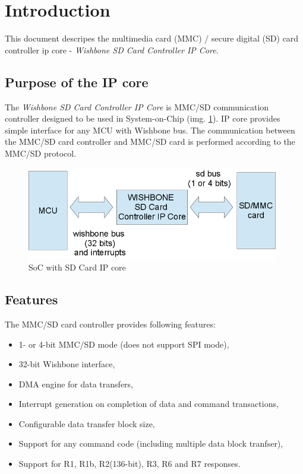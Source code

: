 
\section{Introduction}
\label{sec:introduction}

    This document descripes the multimedia card (MMC) / secure digital (SD) card controller ip core - \textit{Wishbone SD Card Controller IP Core}.

    \subsection{Purpose of the IP core}
    \label{sec:purpose}

    The \textit{Wishbone SD Card Controller IP Core} is MMC/SD communication controller designed to be used in System-on-Chip (img. \ref{img:ip_core}).
    IP core provides simple interface for any MCU with Wishbone bus. The communication between the MMC/SD card controller and MMC/SD card 
    is performed according to the MMC/SD protocol.
    
    \begin{figure}[H]
        \centering
        \includegraphics[width=11cm]{../bin/ip_core.png}
        \caption{SoC with SD Card IP core}
        \label{img:ip_core}
    \end{figure}
    
    \subsection{Features}
    \label{sec:fetures}
    The MMC/SD card controller provides following features:
    
    \begin{itemize}
     \item 1- or 4-bit MMC/SD mode (does not support SPI mode),
     \item 32-bit Wishbone interface,
     \item DMA engine for data transfers,
     \item Interrupt generation on completion of data and command transactions,
     \item Configurable data transfer block size,
     \item Support for any command code (including multiple data block tranfser),
     \item Support for R1, R1b, R2(136-bit), R3, R6 and R7 responses.
    \end{itemize}
